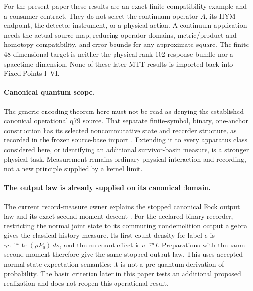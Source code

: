\documentclass[11pt]{article}
\begin{document}
For the present paper these results are an exact finite compatibility
example and a consumer contract. They do not select the continuum
operator \(A\), its HYM endpoint, the detector instrument, or a physical
action. A continuum application needs the actual source map, reducing
operator domains, metric/product and homotopy compatibility, and error
bounds for any approximate square. The finite 48-dimensional target is
neither the physical rank-102 response bundle nor a spacetime dimension.
None of these later MTT results is imported back into Fixed Points I--VI.

\paragraph{Canonical quantum scope.}
The generic encoding theorem here must not be read as denying the
established canonical operational q79 source. That separate finite-symbol,
binary, one-anchor construction has its selected noncommutative state and
recorder structure, as recorded in the frozen source-base import
\cite{CanonicalQ79Source}. Extending it to every apparatus class considered
here, or identifying an additional survivor-basin measure, is a stronger
physical task. Measurement remains ordinary physical interaction and
recording, not a new principle supplied by a kernel limit.

\paragraph{The output law is already supplied on its canonical domain.}
\label{par:canonical-output-consumer}
The current record-measure owner explains the stopped canonical Fock
output law and its exact second-moment descent \cite{MTTRecordOwner,FockOutput}.
For the declared binary recorder, restricting the normal joint state to
its commuting nondemolition output algebra gives the classical history
measure. Its first-count density for label \(a\) is
\(\gamma e^{-\gamma s}\operatorname{tr}(\rho P_a)\,ds\), and the no-count
effect is \(e^{-\gamma u}I\). Preparations with the same second moment
therefore give the same stopped-output law. This uses accepted normal-state
expectation semantics; it is not a pre-quantum derivation of probability.
The basin criterion later in this paper tests an additional proposed
realization and does not reopen this operational result.
\end{document}
